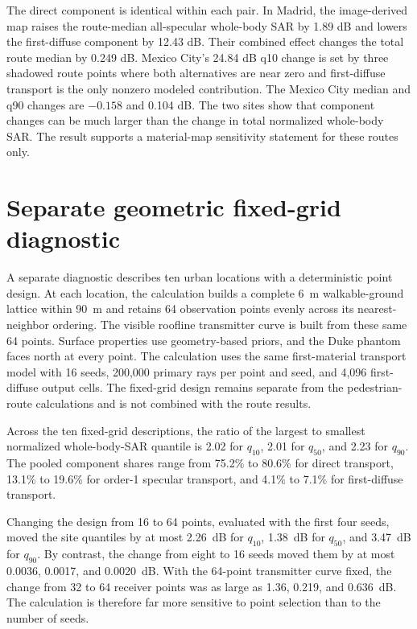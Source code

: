 The direct component is identical within each pair. In Madrid, the image-derived map raises
the route-median all-specular whole-body SAR by 1.89 dB and lowers the
first-diffuse component by 12.43 dB. Their combined effect changes the total
route median by 0.249 dB. Mexico City's 24.84 dB q10 change is set by three
shadowed route points where both alternatives are near zero and first-diffuse
transport is the only nonzero modeled contribution. The Mexico City median and q90
changes are $-0.158$ and 0.104 dB. The two sites show that component changes can
be much larger than the change in total normalized whole-body SAR. The result
supports a material-map sensitivity statement for these routes only.

\FloatBarrier
\section{Separate geometric fixed-grid diagnostic}
\label{sec:si-geometric-screening}

A separate diagnostic describes ten urban locations with a deterministic point
design. At each location, the calculation builds a complete 6~m walkable-ground
lattice within 90~m and retains 64 observation points evenly across its
nearest-neighbor ordering. The visible roofline transmitter curve is built from
these same 64 points. Surface properties use geometry-based priors, and the
Duke phantom faces north at every point. The calculation uses the same
first-material transport model with 16 seeds, 200,000 primary rays per point
and seed, and 4,096 first-diffuse output cells. The fixed-grid design remains
separate from the pedestrian-route calculations and is not combined with the
route results.

Across the ten fixed-grid descriptions, the ratio of the largest to smallest
normalized whole-body-SAR quantile is 2.02 for $q_{10}$, 2.01 for $q_{50}$,
and 2.23 for $q_{90}$. The pooled component shares range from 75.2\% to
80.6\% for direct transport, 13.1\% to 19.6\% for order-1 specular transport,
and 4.1\% to 7.1\% for first-diffuse transport.

Changing the design from 16 to 64 points, evaluated with the first four seeds,
moved the site quantiles by at most 2.26~dB for $q_{10}$, 1.38~dB for
$q_{50}$, and 3.47~dB for $q_{90}$. By contrast, the change from eight to
16 seeds moved them by at most 0.0036, 0.0017, and 0.0020~dB. With the
64-point transmitter curve fixed, the change from 32 to 64 receiver points was
as large as 1.36, 0.219, and 0.636~dB. The calculation is therefore far more
sensitive to point selection than to the number of seeds.

